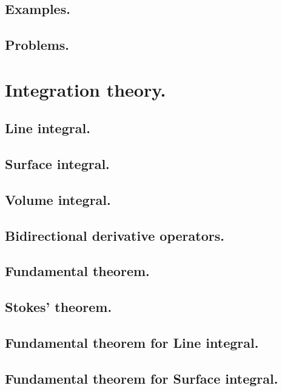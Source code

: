       \subsection{Examples.}
         
      \subsection{Problems.}
         
         
         
         
         
   \section{Integration theory.}
      \subsection{Line integral.}
         
      \subsection{Surface integral.}
         
      \subsection{Volume integral.}
         
      \subsection{Bidirectional derivative operators.}
         
      \subsection{Fundamental theorem.}
         
      \subsection{Stokes' theorem.}
         
      \subsection{Fundamental theorem for Line integral.}
         
      \subsection{Fundamental theorem for Surface integral.}
         
